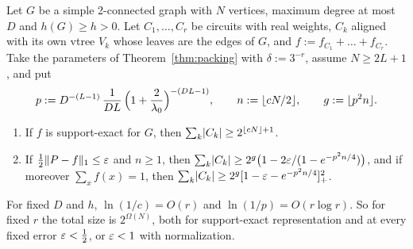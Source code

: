 \begin{theorem}\label{thm:signed-sums-linear}
Let $G$ be a simple 2-connected graph with $N$ vertices, maximum degree at most $D$ and $h(G)\ge h>0$. Let $C_1,\dots,C_r$ be circuits with real weights, $C_k$ aligned with its own vtree $V_k$ whose leaves are the edges of $G$, and $f:=f_{C_1}+\dots+f_{C_r}$. Take the parameters of Theorem~\ref{thm:packing} with $\delta:=3^{-r}$, assume $N\ge2L+1$, and put
\[
  p:=D^{-(L-1)}\,\frac1{DL}\,\Bigl(1+\frac2{\lambda_0}\Bigr)^{-(DL-1)},\qquad n:=\lfloor cN/2\rfloor,\qquad g:=\lfloor p^2n\rfloor .
\]
\begin{enumerate}[label=(\alph*)]
\item If $f$ is support-exact for $G$, then $\sum_k\lvert C_k\rvert\ge2^{\lfloor cN\rfloor+1}$.
\item If $\frac12\lVert P-f\rVert_1\le\varepsilon$ and $n\ge1$, then $\sum_k\lvert C_k\rvert\ge2^g\bigl(1-2\varepsilon/(1-e^{-p^2n/4})\bigr)$, and if moreover $\sum_xf(x)=1$, then $\sum_k\lvert C_k\rvert\ge2^g[1-\varepsilon-e^{-p^2n/4}]_+^2$.
\end{enumerate}
For fixed $D$ and $h$, $\ln(1/c)=O(r)$ and $\ln(1/p)=O(r\log r)$. So for fixed $r$ the total size is $2^{\Omega(N)}$, both for support-exact representation and at every fixed error $\varepsilon<\frac12$, or $\varepsilon<1$ with normalization.
\end{theorem}

